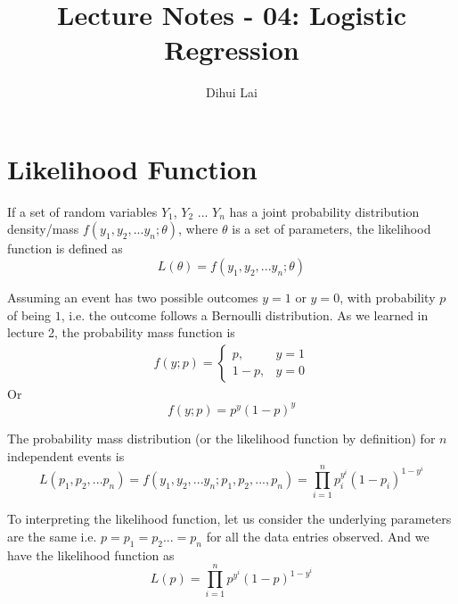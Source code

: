 \documentclass[12pt, oneside]{article}
\title{Lecture Notes - 04: Logistic Regression}
\author{Dihui Lai}
\begin{document}
\maketitle
\tableofcontents

\vspace{.25in}

\section{Likelihood Function}

If a set of random variables $Y_1$, $Y_2$ ... $Y_n$ has a joint probability distribution density/mass $f(y_1, y_2, ...y_n;\theta)$, where $\theta$ is a set of parameters, the likelihood function is defined as 
\begin{equation}
L(\theta)=f(y_1, y_2, ...y_n; \theta)
\end{equation}

Assuming an event has two possible outcomes $y=1$ or $y=0$, with probability $p$ of being $1$, i.e. the outcome follows a Bernoulli distribution. As we learned in lecture 2, the probability mass function is 
\begin{align*}
f(y; p)=
\begin{cases}
p, &y=1\\
1-p,  &y=0
\end{cases}
\end{align*}
Or 
$$f(y;p)=p^y(1-p)^y$$

The probability mass distribution (or the likelihood function by definition) for $n$ independent events is
$$L(p_1, p_2,...p_n)=f(y_1, y_2, ...y_n; p_1, p_2, ..., p_n)=\prod_{i=1}^{n}p_{i}^{y^i}(1-p_{i})^{1-y^{i}}$$

To interpreting the likelihood function, let us consider the underlying parameters are the same i.e. $p=p_1=p_2...=p_n$ for all the data entries observed. And we have the likelihood function as
$$L(p)={\prod_{i=1}^{n}p^{y^i}(1-p)^{1-y^{i}}}$$
\end{document}
